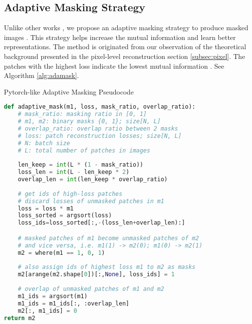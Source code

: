 \documentclass[10pt,twocolumn,letterpaper]{article}
\begin{document}
\subsection{Adaptive Masking Strategy} \label{subsec:adamask}
Unlike other works \cite{mae,simmim,data2vec,beit}, we propose an adaptive masking strategy to produce masked images . This strategy helps increase the mutual information  and learn better representations. The method is originated from our observation of the theoretical background presented in the pixel-level reconstruction section \ref{subsec:pixel}. The patches with the highest loss indicate the lowest mutual information . See Algorithm \ref{alg:adamask}.
\begin{algorithm}[t]
\caption{Pytorch-like Adaptive Masking Pseudocode}
\label{alg:adamask}
\small
\begin{lstlisting}[language=python]
def adaptive_mask(m1, loss, mask_ratio, overlap_ratio):
    # mask_ratio: masking ratio in [0, 1]
    # m1, m2: binary masks {0, 1}; size[N, L]
    # overlap_ratio: overlap ratio between 2 masks
    # loss: patch reconstruction losses; size[N, L]
    # N: batch size
    # L: total number of patches in images
    
    len_keep = int(L * (1 - mask_ratio)) 
    loss_len = int(L - len_keep * 2) 
    overlap_len = int(len_keep * overlap_ratio) 
    
    # get ids of high-loss patches
    # discard losses of unmasked patches in m1
    loss = loss * m1 
    loss_sorted = argsort(loss)
    loss_ids=loss_sorted[:,-(loss_len+overlap_len):]

    # masked patches of m1 become unmasked patches of m2
    # and vice versa, i.e. m1(1) -> m2(0); m1(0) -> m2(1)
    m2 = where(m1 == 1, 0, 1)
    
    # also assign ids of highest loss m1 to m2 as masks
    m2[arange(m2.shape[0])[:,None], loss_ids] = 1
    
    # overlap of unmasked patches of m1 and m2
    m1_ids = argsort(m1)
    m1_ids = m1_ids[:, :overlap_len]
    m2[:, m1_ids] = 0
return m2
\end{lstlisting}
\end{algorithm}
\end{document}
